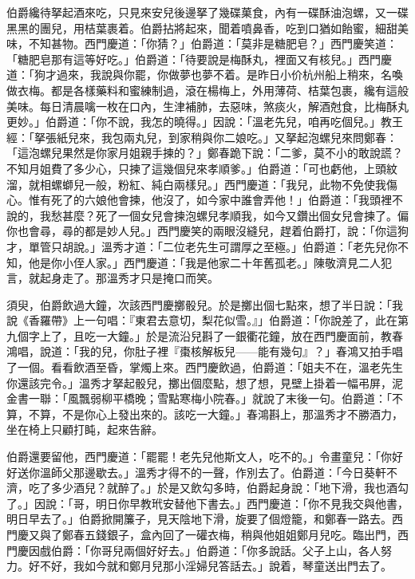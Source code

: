 伯爵纔待拏起酒來吃，只見來安兒後邊拏了幾碟菓食，內有一碟酥油泡螺，又一碟黑黑的團兒，用桔葉裹着。伯爵拈將起來，聞着噴鼻香，吃到口猶如飴蜜，細甜美味，不知甚物。西門慶道：「你猜？」伯爵道：「莫非是糖肥皂？」西門慶笑道：「糖肥皂那有這等好吃。」伯爵道：「待要說是梅酥丸，裡面又有核兒。」西門慶道：「狗才過來，我說與你罷，你做夢也夢不着。是昨日小价杭州船上稍來，名喚做衣梅。都是各樣藥料和蜜練制過，滾在楊梅上，外用薄荷、桔葉包裹，纔有這般美味。每日清晨噙一枚在口內，生津補肺，去惡味，煞痰火，解酒尅食，比梅酥丸更妙。」伯爵道：「你不說，我怎的曉得。」因說：「溫老先兒，咱再吃個兒。」教王經：「拏張紙兒來，我包兩丸兒，到家稍與你二娘吃。」又拏起泡螺兒來問鄭春：「這泡螺兒果然是你家月姐親手揀的？」鄭春跪下說：「二爹，莫不小的敢說謊？不知月姐費了多少心，只揀了這幾個兒來孝順爹。」伯爵道：「可也虧他，上頭紋溜，就相螺螄兒一般，粉紅、純白兩樣兒。」西門慶道：「我兒，此物不免使我傷心。惟有死了的六娘他會揀，他沒了，如今家中誰會弄他！」伯爵道：「我頭裡不說的，我愁甚麼？死了一個女兒會揀泡螺兒孝順我，如今又鑽出個女兒會揀了。偏你也會尋，尋的都是妙人兒。」{}西門慶笑的兩眼沒縫兒，趕着伯爵打，說：「你這狗才，單管只胡說。」溫秀才道：「二位老先生可謂厚之至極。」{}伯爵道：「老先兒你不知，他是你小侄人家。」西門慶道：「我是他家二十年舊孤老。」陳敬濟見二人犯言，就起身走了。那溫秀才只是掩口而笑。{}

須臾，伯爵飲過大鐘，次該西門慶擲骰兒。於是擲出個七點來，想了半日說：「我說《香羅帶》上一句唱：『東君去意切，梨花似雪。』」伯爵道：「你說差了，此在第九個字上了，且吃一大鐘。」於是流沿兒斟了一銀衢花鐘，放在西門慶面前，教春鴻唱，說道：「我的兒，你肚子裡『棗核解板兒——能有幾句』？」春鴻又拍手唱了一個。看看飲酒至昏，掌燭上來。西門慶飲過，伯爵道：「姐夫不在，溫老先生你還該完令。」溫秀才拏起骰兒，擲出個麼點，想了想，見壁上掛着一幅弔屏，泥金書一聯：「風飄弱柳平橋晚；雪點寒梅小院春。」就說了末後一句。伯爵道：「不算，不算，不是你心上發出來的。該吃一大鐘。」春鴻斟上，那溫秀才不勝酒力，坐在椅上只顧打盹，起來告辭。

伯爵還要留他，西門慶道：「罷罷！老先兒他斯文人，吃不的。」令畫童兒：「你好好送你溫師父那邊歇去。」溫秀才得不的一聲，作別去了。伯爵道：「今日葵軒不濟，吃了多少酒兒？就醉了。」於是又飲勾多時，伯爵起身說：「地下滑，我也酒勾了。」因說：「哥，明日你早教玳安替他下書去。」西門慶道：「你不見我交與他書，明日早去了。」伯爵掀開簾子，見天陰地下滑，旋要了個燈籠，和鄭春一路去。西門慶又與了鄭春五錢銀子，盒內回了一礶衣梅，稍與他姐姐鄭月兒吃。臨出門，西門慶因戲伯爵：「你哥兒兩個好好去。」{}伯爵道：「你多說話。父子上山，各人努力。好不好，我如今就和鄭月兒那小淫婦兒答話去。」說着，琴童送出門去了。

